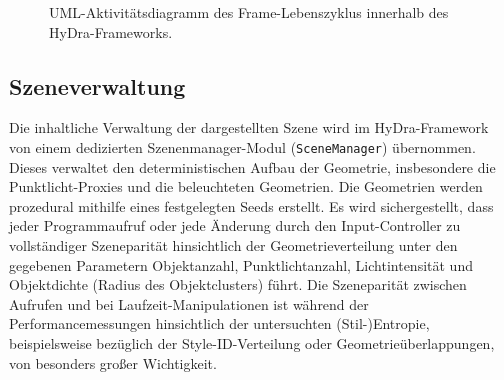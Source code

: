 \begin{figure}[htbp]
{%
    }
    \caption[UML-Aktivitätsdiagramm des Frame-Lebenszyklus]{UML-Aktivitätsdiagramm des Frame-Lebenszyklus innerhalb des
    HyDra-Frameworks.}
    \label{fig:render_loop_swimlane}
\end{figure}

\subsection{Szeneverwaltung}
\label{subsec:040102_scene_management}

Die inhaltliche Verwaltung der dargestellten Szene wird im \ac{HyDra}-Framework von einem dedizierten
Szenenmanager-Modul (\texttt{SceneManager}) übernommen.
Dieses verwaltet den deterministischen Aufbau der Geometrie, insbesondere die Punktlicht-Proxies und die beleuchteten
Geometrien.
Die Geometrien werden prozedural mithilfe eines festgelegten Seeds erstellt.
Es wird sichergestellt, dass jeder Programmaufruf oder jede Änderung durch den Input-Controller zu vollständiger
Szeneparität hinsichtlich der Geometrieverteilung unter den gegebenen Parametern Objektanzahl, Punktlichtanzahl,
Lichtintensität und Objektdichte (Radius des Objektclusters) führt.
Die Szeneparität zwischen Aufrufen und bei Laufzeit-Manipulationen ist während der Performancemessungen hinsichtlich der
untersuchten (Stil-)Entropie, beispielsweise bezüglich der Style-ID-Verteilung oder Geometrieüberlappungen, von
besonders großer Wichtigkeit.

